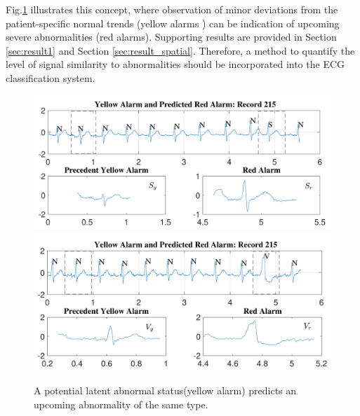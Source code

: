 Fig.\ref{fig:pred_signals} illustrates this concept, where observation of minor deviations from the patient-specific normal trends (yellow alarms ) can be indication of upcoming severe abnormalities (red alarms). Supporting results are provided in Section \ref{sec:result1} and Section \ref{sec:result_spatial}.%
Therefore, a method to quantify the level of signal similarity to abnormalities should be incorporated into the ECG classification system.

 \begin{figure}[t]
 	\centering
 	\includegraphics[scale=0.6]{Fig/predicting_record215S_croped.pdf}
 	\includegraphics[scale=0.6]{Fig/predicting_record215_croped.pdf} 
 	\caption{A potential latent abnormal status(yellow alarm) predicts an upcoming abnormality of the same type.}
 	\label{fig:pred_signals}
 \end{figure}




